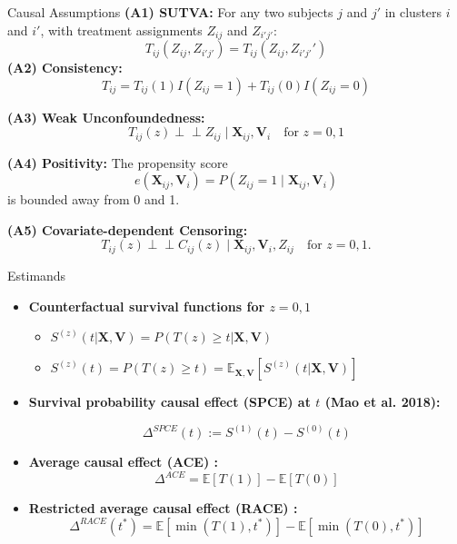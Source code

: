 \documentclass{beamer}
\begin{document}
\begin{frame}{Causal Assumptions}
  \textbf{(A1) SUTVA:} 
  For any two subjects $j$ and $j'$ in clusters $i$ and $i'$, with treatment assignments $Z_{ij}$ and $Z_{i'j'}$:
          \[
          T_{ij}(Z_{ij}, Z_{i'j'}) = T_{ij}(Z_{ij}, Z_{i'j'}')
          \]
  \textbf{(A2) Consistency:} 
  \[
  T_{ij} = T_{ij}(1)I(Z_{ij}=1) + T_{ij}(0)I(Z_{ij}=0)
  \]

  
  \textbf{(A3) Weak Unconfoundedness:} 
  \[
  T_{ij}(z) \perp\!\!\!\perp Z_{ij}\mid \mathbf{X}_{ij},\mathbf{V}_i \quad \text{for } z=0,1
  \]
 
  
  \textbf{(A4) Positivity:} The propensity score 
  \[
  e(\mathbf{X}_{ij},\mathbf{V}_i)=P(Z_{ij}=1\mid \mathbf{X}_{ij},\mathbf{V}_i)
  \]
  is bounded away from 0 and 1.

  
  \textbf{(A5) Covariate-dependent Censoring:}
  \[
  T_{ij}(z) \perp\!\!\!\perp C_{ij}(z)\mid \mathbf{X}_{ij},\mathbf{V}_i,Z_{ij} \quad \text{for } z=0,1.
  \]
\end{frame}


\begin{frame}{Estimands}
    \begin{itemize}

\item \textbf{Counterfactual survival functions for $z = 0, 1$} 

\begin{itemize}
\item $S^{(z)}(t|\mathbf{X},\mathbf{V}) = P(T(z) \ge t | \mathbf{X},\mathbf{V})$
\item $S^{(z)}(t) = P(T(z) \ge t) = \mathbb{E}_{\mathbf{X},\mathbf{V}}[S^{(z)}(t|\mathbf{X},\mathbf{V})]$
\end{itemize}

\item \textbf{Survival probability causal effect (SPCE) at $t$ (Mao et al. 2018):} 

\[ \Delta^{SPCE}(t) := S^{(1)}(t) - S^{(0)}(t) \]


\item \textbf{Average causal effect (ACE) :} 
\[\Delta^{ACE} = \mathbb{E}[T(1)] - \mathbb{E}[T(0)] \]
\item \textbf{Restricted average causal effect (RACE) :}
\[\Delta^{RACE}(t^*) = \mathbb{E}[\min(T(1), t^*)] - \mathbb{E}[\min(T(0), t^*)] \]

\end{itemize}
\end{frame}
\end{document}
